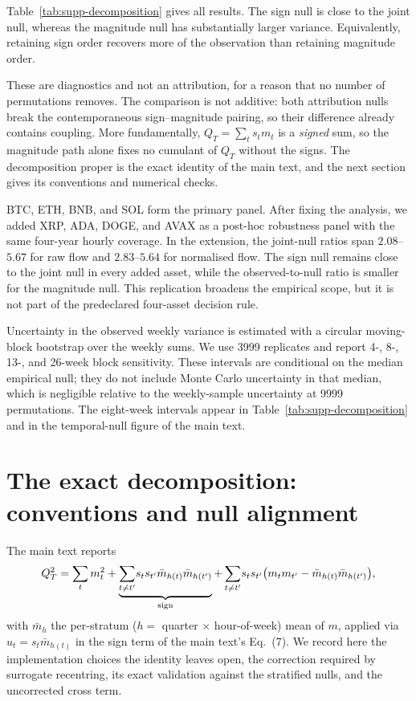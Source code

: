 \documentclass[aps,pre,onecolumn,superscriptaddress,floatfix,nofootinbib]{revtex4-2}
\begin{document}
Table~\ref{tab:supp-decomposition} gives all results. The sign null is close to
the joint null, whereas the magnitude null has substantially larger variance.
Equivalently, retaining sign order recovers more of the observation than
retaining magnitude order.

These are diagnostics and not an attribution, for a reason that no number of
permutations removes. The comparison is not additive: both attribution nulls
break the contemporaneous sign--magnitude pairing, so their difference already
contains coupling. More fundamentally, $Q_T=\sum_t s_t m_t$ is a \emph{signed}
sum, so the magnitude path alone fixes no cumulant of $Q_T$ without the signs.
The decomposition proper is the exact identity of the main text, and the next
section gives its conventions and numerical checks.

BTC, ETH, BNB, and SOL form the primary panel. After fixing the analysis, we
added XRP, ADA, DOGE, and AVAX as a post-hoc robustness panel with the same
four-year hourly coverage. In the extension, the joint-null ratios span
$2.08$--$5.67$ for raw flow and $2.83$--$5.64$ for normalised flow. The sign
null remains close to the joint null in every added asset, while the
observed-to-null ratio is smaller for the magnitude null. This replication
broadens the empirical scope, but it is not
part of the predeclared four-asset decision rule.

Uncertainty in the observed weekly variance is estimated with a circular
moving-block bootstrap over the weekly sums. We use 3999 replicates and report
4-, 8-, 13-, and 26-week block sensitivity. These intervals are conditional on
the median empirical null; they do not include Monte Carlo uncertainty in that
median, which is negligible relative to the weekly-sample uncertainty at 9999
permutations. The eight-week intervals appear in
Table~\ref{tab:supp-decomposition} and in the temporal-null figure of the main
text.

\section{The exact decomposition: conventions and null alignment}
\label{sec:supp-decomp}

The main text reports
\begin{equation}
  Q_T^2=\sum_{t}m_t^2
   +\underbrace{\sum_{t\neq t'}\!s_t s_{t'}
      \bar m_{h(t)}\bar m_{h(t')}}_{\rm sign}
   +\sum_{t\neq t'}\!s_t s_{t'}
      \bigl(m_t m_{t'}-\bar m_{h(t)}\bar m_{h(t')}\bigr) ,
  \label{eq:supp-decomp}
\end{equation}
with $\bar m_h$ the per-stratum ($h=$ quarter $\times$ hour-of-week) mean of
$m$, applied via $u_t=s_t\bar m_{h(t)}$ in the sign term of the main text's
Eq.~(7). We record here the implementation choices the identity leaves open,
the correction required by surrogate recentring, its exact validation against
the stratified nulls, and the uncorrected cross term.
\end{document}
